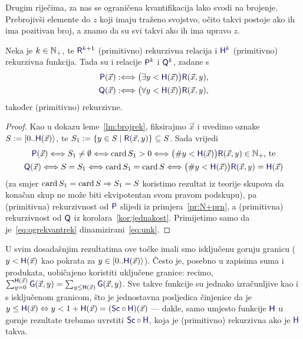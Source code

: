 Drugim riječima, za nas se ograničena kvantifikacija lako svodi na brojenje. Prebrojivši elemente do $z$ koji imaju traženo svojstvo, očito takvi postoje ako ih ima pozitivan broj, a znamo da su svi takvi ako ih ima upravo $z$.

\begin{propozicija}\label{prop:okvantrek}
Neka je $k\in{\mathbb N}_+$, te $\f R^{k+1}$ (primitivno) rekurzivna relacija i $\f H^k$ (primitivno) rekurzivna funkcija. Tada su i relacije $\f P^k$ i $\f Q^k$, zadane s
\begin{align}
    \f P(\vec x):\Longleftrightarrow\bigl(\exists y<\f H(\vec x)\bigr)\f R(\vec x,y)\text,\\
    \f Q(\vec x):\Longleftrightarrow\bigl(\forall y<\f H(\vec x)\bigr)\f R(\vec x,y)\text,
\end{align}
također (primitivno) rekurzivne.
\end{propozicija}
\begin{proof}
    Kao u dokazu leme~\ref{lm:brojrek}, fiksirajmo $\vec x$ i uvedimo oznake $S:=[0..\f H(\vec x)\rangle$, te $S_1:=\{y\in S\mid\f R(\vec x,y)\}\subseteq S$. Sada vrijedi
    \begin{gather}
    \label{eq:ogrekvantrek}
        \f P(\vec x)\Longleftrightarrow S_1\not=\emptyset\Longleftrightarrow\card S_1>0\Longleftrightarrow\bigl(\#y<\f H(\vec x)\bigr)\f R(\vec x,y)\in\N_+\text{, te}\\
        \f Q(\vec x)\Longleftrightarrow S=S_1\Longleftrightarrow\card S_1=\card S\Longleftrightarrow\bigl(\#y<\f H(\vec x)\bigr)\f R(\vec x,y)\eq\f H(\vec x)
    \end{gather}
    (za smjer $\operatorname{card} S_1=\operatorname{card} S\Rightarrow S_1=S$ koristimo rezultat iz teorije skupova da konačan skup ne može biti ekvipotentan svom pravom podskupu), pa (primitivna) rekurzivnost od $\f P$ slijedi iz primjera~\ref{pr:N+prn}, a (primitivna) rekurzivnost od $\f Q$ iz korolara~\ref{kor:jednakost}. Primijetimo samo da je~\eqref{eq:ogrekvantrek} dinamizirani~\eqref{eq:unk}.
\end{proof}

\begin{napomena}\label{nap:kvantSc}
U svim dosadašnjim rezultatima ove točke imali smo isključenu gornju granicu ($y<\f H(\vec x)$ kao pokrata za $y\in[0..\f H(\vec x)\rangle$). Često je, posebno u zapisima suma i produkata, uobičajeno koristiti uključene granice: recimo, $\sum_{y=0}^{\f H(\vec x)}\f G(\vec x,y)=\sum_{y\le\f H(\vec x)}\f G(\vec x,y)$. Sve takve funkcije su jednako izračunljive kao i s isključenom granicom, što je jednostavna posljedica činjenice da je $y\le\f H(\vec x)\Leftrightarrow y<1+\f H(\vec x)=(\f{Sc}\circ\f H)(\vec x)$ --- dakle, samo umjesto funkcije $\f H$ u gornje rezultate trebamo uvrstiti $\f{Sc}\circ\f H$, koja je (primitivno) rekurzivna ako je $\f H$ takva.
%
\end{napomena}

